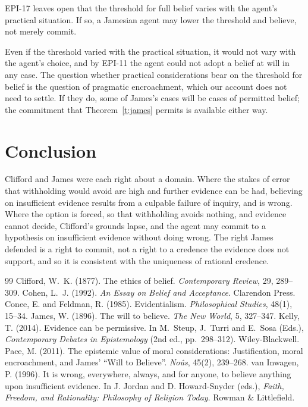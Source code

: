 \documentclass{situationist-preprint}
\begin{document}
\begin{objection}
EPI-17 leaves open that the threshold for full belief varies with the agent's practical situation. If so, a Jamesian agent may lower the threshold and believe, not merely commit.
\end{objection}

\begin{reply}
Even if the threshold varied with the practical situation, it would not vary with the agent's choice, and by EPI-11 the agent could not adopt a belief at will in any case. The question whether practical considerations bear on the threshold for belief is the question of pragmatic encroachment, which our account does not need to settle. If they do, some of James's cases will be cases of permitted belief; the commitment that Theorem~\ref{t:james} permits is available either way.
\end{reply}

\section{Conclusion}

Clifford and James were each right about a domain. Where the stakes of error that withholding would avoid are high and further evidence can be had, believing on insufficient evidence results from a culpable failure of inquiry, and is wrong. Where the option is forced, so that withholding avoids nothing, and evidence cannot decide, Clifford's grounds lapse, and the agent may commit to a hypothesis on insufficient evidence without doing wrong. The right James defended is a right to commit, not a right to a credence the evidence does not support, and so it is consistent with the uniqueness of rational credence.

\begin{thebibliography}{99}\small
{} Clifford, W.~K. (1877). The ethics of belief. \emph{Contemporary Review}, 29, 289--309.
 Cohen, L.~J. (1992). \emph{An Essay on Belief and Acceptance}. Clarendon Press.
 Conee, E. and Feldman, R. (1985). Evidentialism. \emph{Philosophical Studies}, 48(1), 15--34.
 James, W. (1896). The will to believe. \emph{The New World}, 5, 327--347.
 Kelly, T. (2014). Evidence can be permissive. In M.~Steup, J.~Turri and E.~Sosa (Eds.), \emph{Contemporary Debates in Epistemology} (2nd ed., pp.~298--312). Wiley-Blackwell.
 Pace, M. (2011). The epistemic value of moral considerations: Justification, moral encroachment, and James' \enquote{Will to Believe}. \emph{No\^us}, 45(2), 239--268.
 van Inwagen, P. (1996). It is wrong, everywhere, always, and for anyone, to believe anything upon insufficient evidence. In J. Jordan and D. Howard-Snyder (eds.), \emph{Faith, Freedom, and Rationality: Philosophy of Religion Today}. Rowman \& Littlefield.
\end{thebibliography}
\end{document}
